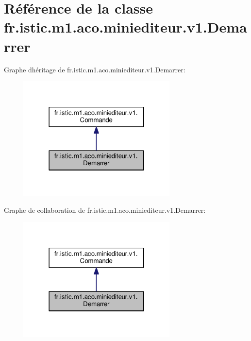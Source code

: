 \hypertarget{classfr_1_1istic_1_1m1_1_1aco_1_1miniediteur_1_1v1_1_1Demarrer}{}\section{Référence de la classe fr.\+istic.\+m1.\+aco.\+miniediteur.\+v1.\+Demarrer}
\label{classfr_1_1istic_1_1m1_1_1aco_1_1miniediteur_1_1v1_1_1Demarrer}


Graphe d\textquotesingle{}héritage de fr.\+istic.\+m1.\+aco.\+miniediteur.\+v1.\+Demarrer\+:
\nopagebreak
\begin{figure}[H]
\begin{center}
\leavevmode
\includegraphics[width=226pt]{classfr_1_1istic_1_1m1_1_1aco_1_1miniediteur_1_1v1_1_1Demarrer__inherit__graph}
\end{center}
\end{figure}


Graphe de collaboration de fr.\+istic.\+m1.\+aco.\+miniediteur.\+v1.\+Demarrer\+:
\nopagebreak
\begin{figure}[H]
\begin{center}
\leavevmode
\includegraphics[width=226pt]{classfr_1_1istic_1_1m1_1_1aco_1_1miniediteur_1_1v1_1_1Demarrer__coll__graph}
\end{center}
\end{figure}
